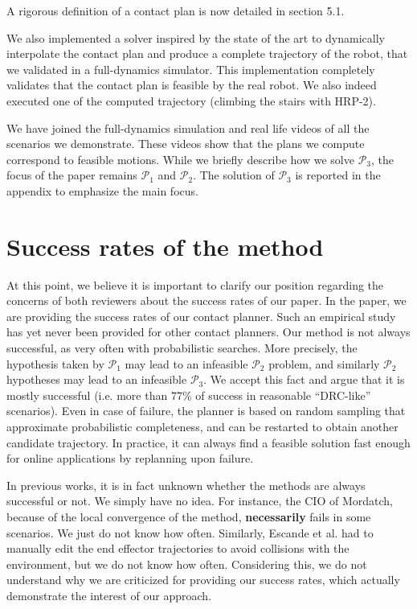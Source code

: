 \documentclass[a4paper]{article}
\begin{document}
A rigorous definition of a contact plan is now detailed in section 5.1. 


We also implemented a solver inspired by the state of the art to dynamically interpolate the contact plan and produce a complete trajectory of the robot, that we validated in a full-dynamics simulator. 
This implementation completely validates that the contact plan is feasible by the real robot.
We also indeed executed one of the computed trajectory (climbing the stairs with HRP-2).

We have joined the full-dynamics simulation and real life videos of all the scenarios we demonstrate.
These videos show that the plans we compute correspond to feasible motions.
While we briefly describe how we solve $\mathcal{P}_3$, the focus of the paper remains $\mathcal{P}_1$ and $\mathcal{P}_2$. 
The solution of $\mathcal{P}_3$ is reported in the appendix to emphasize the main focus.

\newcommand{\mP}[1]{$\mathcal{P}_#1$}

\section{Success rates of the method}
At this point, we believe it is important to clarify our position regarding the concerns of both reviewers about the success rates of our paper.
In the paper, we are providing the success rates of our contact planner. 
Such an empirical study has yet never been provided for other contact planners.
Our method is not always successful, as very often with probabilistic searches.
More precisely, the hypothesis taken by \mP1 may lead to an infeasible \mP2 problem, and similarly \mP2 hypotheses may lead to an infeasible \mP3.
We accept this fact and argue that it is mostly successful (i.e. more than 77\% of success in reasonable ``DRC-like'' scenarios).
Even in case of failure, the planner is based on random sampling that approximate probabilistic completeness, and can be restarted to obtain another candidate trajectory.
In practice, it can always find a feasible solution fast enough for online applications by replanning upon failure.

In previous works, it is in fact unknown whether the methods are always successful or not. We simply have no idea. For instance, the CIO of Mordatch,
because of the local convergence of the method, \textbf{necessarily} fails in some scenarios. We just do not know how often. Similarly, Escande et al. had to manually edit 
the end effector trajectories to avoid collisions with the environment, but we do not know how often. Considering this,
we do not understand why we are criticized for providing our success rates, which actually demonstrate the interest of our approach.
\end{document}

